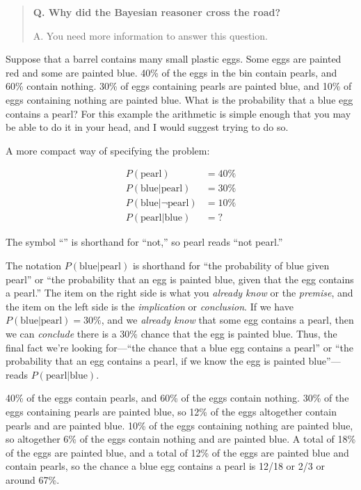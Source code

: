 \hr

\begin{quote}
{
 \textbf{Q. Why did the Bayesian reasoner cross the road?}}

{
  A. You need more information to answer this question.}
\end{quote}

\hr

{
 Suppose that a barrel contains many small plastic eggs. Some eggs
are painted red and some are painted blue. 40\% of the eggs in the bin
contain pearls, and 60\% contain nothing. 30\% of eggs containing
pearls are painted blue, and 10\% of eggs containing nothing are
painted blue. What is the probability that a blue egg contains a pearl?
For this example the arithmetic is simple enough that you may be able
to do it in your head, and I would suggest trying to do so.}

{
 A more compact way of specifying the problem:}

\begin{align*}
 P(\text{pearl}) &= 40\% \\
 P(\text{blue}|\text{pearl}) &= 30\% \\
 P(\text{blue}|\lnot\text{pearl}) &= 10\% \\
 P(\text{pearl}|\text{blue}) &= ?
\end{align*}


{
 The symbol ``{\textlnot}'' is
shorthand for ``not,'' so
{\textlnot}pearl reads ``not
pearl.''}

{
 The notation $P(\text{blue}|\text{pearl})$ is shorthand for
``the probability of blue given
pearl'' or ``the probability that an
egg is painted blue, given that the egg contains a
pearl.'' The item on the right side is what you
\textit{already know} or the \textit{premise}, and the item on the left
side is the \textit{implication} or \textit{conclusion}. If we have
$P(\text{blue}|\text{pearl}) = 30\%$, and we \textit{already know} that some
egg contains a pearl, then we can \textit{conclude} there is a 30\%
chance that the egg is painted blue. Thus, the final fact
we're looking for---``the chance that
a blue egg contains a pearl'' or
``the probability that an egg contains a pearl, if we
know the egg is painted blue''---reads
$P(\text{pearl}|\text{blue})$.}

{
 40\% of the eggs contain pearls, and 60\% of the eggs contain
nothing. 30\% of the eggs containing pearls are painted blue, so 12\%
of the eggs altogether contain pearls and are painted blue. 10\% of the
eggs containing nothing are painted blue, so altogether 6\% of the eggs
contain nothing and are painted blue. A total of 18\% of the eggs are
painted blue, and a total of 12\% of the eggs are painted blue and
contain pearls, so the chance a blue egg contains a pearl is 12/18 or
2/3 or around 67\%.}

